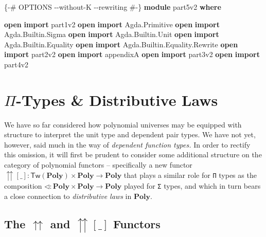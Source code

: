 \documentclass[
  11pt,
  oneside,
  article]{memoir}
\newenvironment{Shaded}{}{}
\newcommand{\KeywordTok}[1]{\textcolor[rgb]{0.00,0.44,0.13}{\textbf{#1}}}
\newcommand{\NormalTok}[1]{#1}
\newcommand{\OtherTok}[1]{\textcolor[rgb]{0.00,0.44,0.13}{#1}}
\newcommand{\PreprocessorTok}[1]{\textcolor[rgb]{0.74,0.48,0.00}{#1}}
\theoremstyle{definition}
\theoremstyle{plain}
\newcommand{\Cat}[1]{\mathbf{#1}}%
\newcommand{\poly}{\Cat{Poly}}
\newcommand{\0}{\textsf{0}}
\newcommand{\1}{\tn{\textsf{1}}}
\begin{document}
\begin{Shaded}
\begin{Highlighting}[]
\PreprocessorTok{\{{-}\# OPTIONS {-}{-}without{-}K {-}{-}rewriting \#{-}\}}
\KeywordTok{module}\NormalTok{ part5v2 }\KeywordTok{where}

\KeywordTok{open} \KeywordTok{import}\NormalTok{ part1v2}
\KeywordTok{open} \KeywordTok{import}\NormalTok{ Agda}\OtherTok{.}\NormalTok{Primitive}
\KeywordTok{open} \KeywordTok{import}\NormalTok{ Agda}\OtherTok{.}\NormalTok{Builtin}\OtherTok{.}\NormalTok{Sigma}
\KeywordTok{open} \KeywordTok{import}\NormalTok{ Agda}\OtherTok{.}\NormalTok{Builtin}\OtherTok{.}\NormalTok{Unit}
\KeywordTok{open} \KeywordTok{import}\NormalTok{ Agda}\OtherTok{.}\NormalTok{Builtin}\OtherTok{.}\NormalTok{Equality}
\KeywordTok{open} \KeywordTok{import}\NormalTok{ Agda}\OtherTok{.}\NormalTok{Builtin}\OtherTok{.}\NormalTok{Equality}\OtherTok{.}\NormalTok{Rewrite}
\KeywordTok{open} \KeywordTok{import}\NormalTok{ part2v2}
\KeywordTok{open} \KeywordTok{import}\NormalTok{ appendixA}
\KeywordTok{open} \KeywordTok{import}\NormalTok{ part3v2}
\KeywordTok{open} \KeywordTok{import}\NormalTok{ part4v2}
\end{Highlighting}
\end{Shaded}

\chapter{\texorpdfstring{\(\Pi\)-Types \& Distributive
Laws}{\textbackslash Pi-Types \& Distributive Laws}}\label{pi-types-distributive-laws}

We have so far considered how polynomial universes may be equipped with
structure to interpret the unit type and dependent pair types. We have
not yet, however, said much in the way of \emph{dependent function
types.} In order to rectify this omission, it will first be prudent to
consider some additional structure on the category of polynomial
functors -- specifically a new functor
\({\upuparrows}[\_] : \mathsf{Tw}(\poly) \times \poly \to \poly\)
that plays a similar role for \texttt{Π} types as the composition
\(\triangleleft : \poly \times \poly \to \poly\)
played for \texttt{Σ} types, and which in turn bears a close connection
to \emph{distributive laws} in \(\poly\).

\section{\texorpdfstring{The \(\upuparrows\) and \({\upuparrows}[\_]\)
Functors}{The \textbackslash upuparrows and \{\textbackslash upuparrows\}{[}\textbackslash\_{]} Functors}}\label{the-upuparrows-and-upuparrows_-functors}
\end{document}

